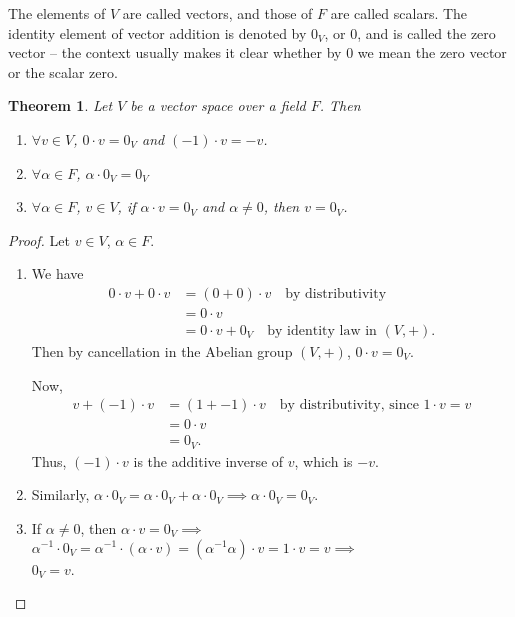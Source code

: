 \documentclass[svgnames]{article}
\newtheorem{Theorem}{Theorem}[section]
\theoremstyle{definition}
\theoremstyle{remark}
\newcommand{\newterm}[1]{{\color{alertcolor} #1}}
\begin{document}
The elements of $V$ are called \newterm{vectors}, and those of $F$ are called \newterm{scalars}. The identity element of vector addition is denoted by $0_V$, or $0$, and is called the \newterm{zero vector} -- the context usually makes it clear whether by $0$ we mean the zero vector or the scalar zero.

\begin{Theorem}
Let $V$ be a vector space over a field $F$. Then
\begin{enumerate}
\item $\forall v \in V$, $0 \cdot v = 0_V$ and $(-1) \cdot v = -v$.
\item $\forall \alpha \in F$, $\alpha \cdot 0_V = 0_V$
\item $\forall \alpha \in F$, $v \in V$, if $\alpha \cdot v = 0_V$ and $\alpha \ne 0$, then $v = 0_V$.
\end{enumerate}
\end{Theorem}
\begin{proof} Let $v \in V$, $\alpha \in F$.
\begin{enumerate}
\item 
We have
\begin{align*}
0 \cdot v + 0 \cdot v & = (0 + 0) \cdot v \quad \text{by distributivity} \\
& = 0 \cdot v \\
& = 0 \cdot v + 0_V \quad \text{by identity law in $(V, +)$.}
\end{align*}
Then by cancellation in the Abelian group $(V, +)$, $0 \cdot v = 0_V$.

\noindent Now,
\begin{align*}
v + (-1) \cdot v & = (1 + -1) \cdot v \quad \text{by distributivity, since $1 \cdot v = v$} \\
& = 0 \cdot v \\
& = 0_V.
\end{align*}
Thus, $(-1) \cdot v$ is the additive inverse of $v$, which is $-v$.

\item Similarly, $\alpha \cdot 0_V = \alpha \cdot 0_V + \alpha \cdot 0_V \implies \alpha \cdot 0_V = 0_V$.

\item If $\alpha \ne 0$, then $\alpha \cdot v = 0_V \implies$\\
	$\alpha^{-1} \cdot 0_V = \alpha^{-1} \cdot (\alpha \cdot v) = (\alpha^{-1} \alpha) \cdot v = 1 \cdot v = v \implies$\\
	$0_V = v$.
\end{enumerate}
\end{proof}
\end{document}
